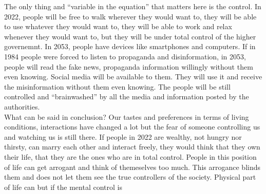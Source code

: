 \documentclass[a4paper,12pt]{article}
\begin{document}

The only thing and ``variable in the equation'' that matters here is the control. In 2022, people will be free to walk wherever they would want to, they will be able to use whatever they would want to, they will be able to work and relax whenever they would want to, but they will be under total control of the higher governemnt. In 2053, people have devices like smartphones and computers. If in 1984 people were forced to listen to propaganda and disinformation, in 2053, people will read the fake news, propaganda information willingly without them even knowing. Social media will be available to them. They will use it and receive the misinformation without them even knowing. The people will be still controlled and ``brainwashed'' by all the media and information posted by the authorities. \\


What can be said in conclusion? Our tastes and preferences in terms of living conditions, interactions have changed a lot but the fear of someone controlling us and watching us is still there. If people in 2022 are wealthy, not hungry nor thirsty, can marry each other and interact freely, they would think that they own their life, that they are the ones who are in total control. People in this position of life can get arrogant and think of themeselves too much. This arrogance blinds them and does not let them see the true controllers of the society. Physical part of life can  but if the mental control is 


\newpage


\end{document}
